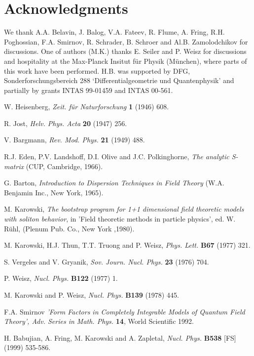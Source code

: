 \documentclass[a4paper,12pt]{article}
\begin{document}
\section*{Acknowledgments}

We thank A.A. Belavin, J. Balog, V.A. Fateev,
R. Flume, A. Fring, R.H. Poghossian, F.A.
Smirnov, R. Schrader, B. Schroer and Al.B. Zamolodchikov for discussions.
One of authors (M.K.) thanks E. Seiler and P. Weisz for discussions and
hospitality at the Max-Planck Insitut f\"{u}r Physik (M\"{u}nchen), where
parts of this work have been performed. H.B. was supported by DFG,
Sonderforschungsbereich 288 `Differentialgeometrie und Quantenphysik' and
partially by grants INTAS 99-01459 and INTAS 00-561.

\begin{thebibliography}{99}
  W. Heisenberg, \emph{Zeit. f\"{u}r Naturforschung} \textbf{%
1} (1946) 608.

  R. Jost, \emph{Helv. Phys. Acta} \textbf{20} (1947) 256.

  V. Bargmann, \emph{Rev. Mod. Phys.} \textbf{21} (1949)
488.

  R.J. Eden, P.V. Landshoff, D.I. Olive and J.C. Polkinghorne, 
\emph{The analytic S-matrix} (CUP, Cambridge, 1966).

  G. Barton, \emph{Introduction to Dispersion Techniques in
Field Theory} (W.A. Benjamin Inc., New York, 1965).

  M. Karowski, \emph{The bootstrap program for 1+1 dimensional
field theoretic models with soliton behavior}, in 'Field theoretic methods
in particle physics', ed. W. R\"{u}hl, (Plenum Pub. Co., New York ,1980).

  M. Karowski, H.J. Thun, T.T. Truong and P. Weisz, \emph{%
Phys. Lett.} \textbf{B67} (1977) 321.

  S. Vergeles and V. Gryanik, \emph{Sov. Journ. Nucl. Phys.} 
\textbf{23} (1976) 704.

  P. Weisz, \emph{Nucl. Phys.} \textbf{B122} (1977) 1.

  M. Karowski and P. Weisz, \emph{Nucl. Phys.} \textbf{B139}
(1978) 445.

  F.A. Smirnov \emph{'Form Factors in Completely Integrable
Models of Quantum Field Theory', Adv. Series in Math. Phys.} \textbf{14},
World Scientific 1992.

  H. Babujian, A. Fring, M. Karowski and A. Zapletal, \emph{%
Nucl. Phys.} \textbf{B538} [FS] (1999) 535-586.


\end{thebibliography}
\end{document}
